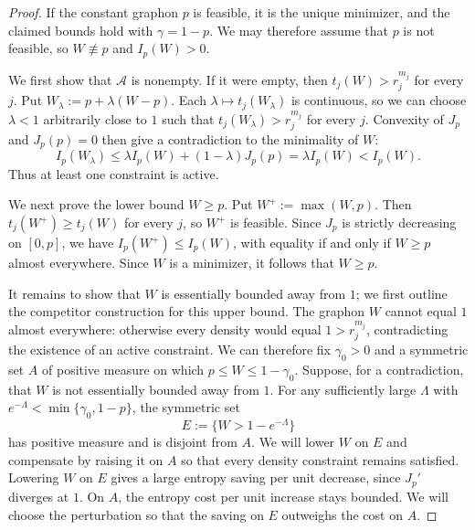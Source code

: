 \begin{proof}
If the constant graphon $p$ is feasible, it is the unique minimizer,
and the claimed bounds hold with $\gamma=1-p$.  We may therefore assume
that $p$ is not feasible, so $W\not\equiv p$ and $I_p(W)>0$.

We first show that $\mathcal A$ is nonempty. If it were empty, then
$t_j(W)>r_j^{m_j}$ for every $j$.
Put $W_\lambda:=p+\lambda(W-p)$.  Each $\lambda\mapsto t_j(W_\lambda)$ is continuous,
so we can choose $\lambda<1$ arbitrarily close to $1$ such that $t_j(W_\lambda)>r_j^{m_j}$ for every $j$.
Convexity of $J_p$ and $J_p(p)=0$ then give a contradiction to the minimality of $W$:
\[
  I_p(W_\lambda)\le \lambda I_p(W)+(1-\lambda)J_p(p)= \lambda I_p(W)<I_p(W).
\]
Thus at least one constraint is active.

We next prove the lower bound $W\ge p$. Put $W^+:=\max(W,p)$.
Then $t_j(W^+)\ge t_j(W)$ for every $j$, so $W^+$ is
feasible.  Since $J_p$ is strictly decreasing on $[0,p]$, we have
$I_p(W^+)\le I_p(W)$, with equality if and only if $W\ge p$ almost everywhere.
Since $W$ is a minimizer, it follows that $W\ge p$.

It remains to show that $W$ is essentially bounded away from $1$;
we first outline the competitor construction for this upper bound.
The graphon $W$ cannot equal $1$ almost everywhere: otherwise every density
would equal $1>r_j^{m_j}$, contradicting the existence of an active
constraint.  We can therefore fix $\gamma_0>0$ and a symmetric set $A$
of positive measure on which $p\le W\le1-\gamma_0$.  Suppose, for a
contradiction, that $W$ is not essentially bounded away from $1$.
For any sufficiently large $\Lambda$ with
$e^{-\Lambda}<\min\{\gamma_0,1-p\}$, the symmetric set
\[
  E:=\{W>1-e^{-\Lambda}\}
\]
has positive measure and is disjoint from $A$. We will lower $W$ on $E$
and compensate by raising it on $A$ so that every density constraint
remains satisfied. Lowering $W$ on $E$ gives a large entropy saving per
unit decrease, since $J_p'$ diverges at $1$. On $A$, the entropy cost per
unit increase stays bounded. We will choose the perturbation so that
the saving on $E$ outweighs the cost on $A$.


\end{proof}
